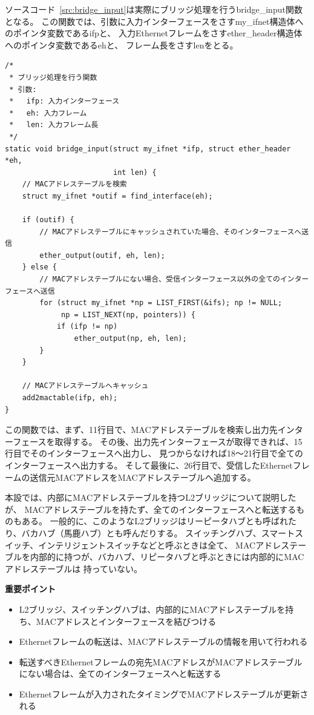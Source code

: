ソースコード~\ref{src:bridge_input}は実際にブリッジ処理を行うbridge\_input関数となる。
この関数では、引数に入力インターフェースをさすmy\_ifnet構造体へのポインタ変数であるifpと、
入力Ethernetフレームをさすether\_header構造体へのポインタ変数であるehと、
フレーム長をさすlenをとる。
\begin{lstlisting}[caption=bridge\_input関数,label=src:bridge_input]
/*
 * ブリッジ処理を行う関数
 * 引数:
 *   ifp: 入力インターフェース
 *   eh: 入力フレーム
 *   len: 入力フレーム長
 */
static void bridge_input(struct my_ifnet *ifp, struct ether_header *eh,
                         int len) {
    // MACアドレステーブルを検索
    struct my_ifnet *outif = find_interface(eh);

    if (outif) {
        // MACアドレステーブルにキャッシュされていた場合、そのインターフェースへ送信
        ether_output(outif, eh, len);
    } else {
        // MACアドレステーブルにない場合、受信インターフェース以外の全てのインターフェースへ送信
        for (struct my_ifnet *np = LIST_FIRST(&ifs); np != NULL;
             np = LIST_NEXT(np, pointers)) {
            if (ifp != np)
                ether_output(np, eh, len);
        }
    }

    // MACアドレステーブルへキャッシュ
    add2mactable(ifp, eh);
}
\end{lstlisting}
この関数では、まず、11行目で、MACアドレステーブルを検索し出力先インターフェースを取得する。
その後、出力先インターフェースが取得できれば、15行目でそのインターフェースへ出力し、
見つからなければ18〜21行目で全てのインターフェースへ出力する。
そして最後に、26行目で、受信したEthernetフレームの送信元MACアドレスをMACアドレステーブルへ追加する。

本設では、内部にMACアドレステーブルを持つL2ブリッジについて説明したが、
MACアドレステーブルを持たず、全てのインターフェースへと転送するものもある。
一般的に、このようなL2ブリッジはリーピータハブとも呼ばれたり、バカハブ（馬鹿ハブ）とも呼んだりする。
スイッチングハブ、スマートスイッチ、インテリジェントスイッチなどと呼ぶときは全て、
MACアドレステーブルを内部的に持つが、バカハブ、リピータハブと呼ぶときには内部的にMACアドレステーブルは
持っていない。

\begin{itembox}[l]{\bf 重要ポイント}
    \begin{itemize}
        \item L2ブリッジ、スイッチングハブは、内部的にMACアドレステーブルを持ち、MACアドレスとインターフェースを結びつける
        \item Ethernetフレームの転送は、MACアドレステーブルの情報を用いて行われる　
        \item 転送すべきEthernetフレームの宛先MACアドレスがMACアドレステーブルにない場合は、全てのインターフェースへと転送する
        \item Ethernetフレームが入力されたタイミングでMACアドレステーブルが更新される
    \end{itemize}
\end{itembox}

